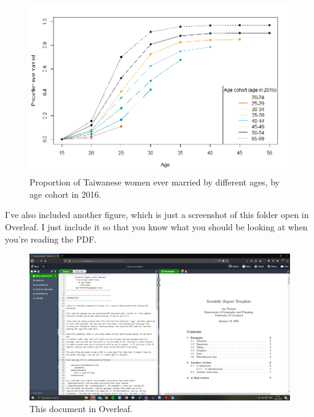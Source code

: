 \documentclass[11pt]{article}
\begin{document}
\begin{figure}
    \includegraphics[scale=0.5]{prop_ev_marr.png}
    \caption{Proportion of Taiwanese women ever married by different ages, by age cohort in 2016.}
    \label{fig:prop_ev_marr}
\end{figure}

I've also included another figure, which is just a screenshot of this folder open in Overleaf. I just include it so that you know what you should be looking at when you're reading the PDF.

\begin{figure}
    \includegraphics[scale=0.2]{screenshot.png}
    \caption{This document in Overleaf.}
    \label{fig:screenshot}
\end{figure}
\end{document}
